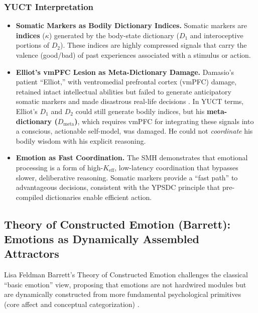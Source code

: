 \documentclass[12pt,a4paper]{article}
\begin{document}
	\subsubsection*{YUCT Interpretation}
	\begin{itemize}
		\item \textbf{Somatic Markers as Bodily Dictionary Indices.} Somatic markers are \textbf{indices} (\(\kappa\)) generated by the body-state dictionary (\(D_1\) and interoceptive portions of \(D_2\)). These indices are highly compressed signals that carry the valence (good/bad) of past experiences associated with a stimulus or action.
		\item \textbf{Elliot's vmPFC Lesion as Meta-Dictionary Damage.} Damasio's patient ``Elliot,'' with ventromedial prefrontal cortex (vmPFC) damage, retained intact intellectual abilities but failed to generate anticipatory somatic markers and made disastrous real-life decisions \cite{Damasio1994}. In YUCT terms, Elliot's \(D_1\) and \(D_2\) could still generate bodily indices, but his \textbf{meta-dictionary (\(D_{\text{meta}}\))}, which requires vmPFC for integrating these signals into a conscious, actionable self-model, was damaged. He could not \textit{coordinate} his bodily wisdom with his explicit reasoning.
		\item \textbf{Emotion as Fast Coordination.} The SMH demonstrates that emotional processing is a form of high-\(K_{\mathrm{eff}}\), low-latency coordination that bypasses slower, deliberative reasoning. Somatic markers provide a ``fast path'' to advantageous decisions, consistent with the YPSDC principle that pre-compiled dictionaries enable efficient action.
	\end{itemize}
	
	\subsection{Theory of Constructed Emotion (Barrett): Emotions as Dynamically Assembled Attractors}
	
	Lisa Feldman Barrett's Theory of Constructed Emotion challenges the classical ``basic emotion'' view, proposing that emotions are not hardwired modules but are dynamically constructed from more fundamental psychological primitives (core affect and conceptual categorization) \cite{Barrett2017}.
	
\end{document}
